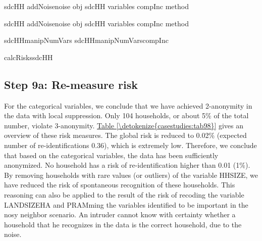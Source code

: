 \documentclass[letterpaper,10pt,english]{sphinxmanual}
\begin{document}
\begin{sphinxVerbatim}[commandchars=\\\{\},numbers=left,firstnumber=1,stepnumber=1]
sdcHH  addNoisenoise   obj  sdcHH variables  compInc method  

sdcHH  addNoisenoise   obj  sdcHH variables  compInc method  

sdcHHmanipNumVars\PYG{p}{[}\PYG{p}{]}  sdcHHmanipNumVars\PYG{p}{[}compInc\PYG{p}{]}

calcRiskssdcHH
\end{sphinxVerbatim}


\subsection{Step 9a: Re-measure risk}
\label{\detokenize{casestudies:step-9a-re-measure-risk}}
For the categorical variables, we conclude that we have achieved
2-anonymity in the data with local suppression. Only 104 households, or
about 5\% of the total number, violate 3-anonymity. \hyperref[\detokenize{casestudies:tab98}]{Table \ref{\detokenize{casestudies:tab98}}} gives an
overview of these risk measures. The global risk is reduced to 0.02\%
(expected number of re-identifications 0.36), which is extremely low.
Therefore, we conclude that based on the categorical variables, the data
has been sufficiently anonymized. No household has a risk of
re-identification higher than 0.01 (1\%). By removing households with
rare values (or outliers) of the variable HHSIZE, we have reduced the
risk of spontaneous recognition of these households. This reasoning can
also be applied to the result of the risk of recoding the variable
LANDSIZEHA and PRAMming the variables identified to be important in the
nosy neighbor scenario. An intruder cannot know with certainty whether a
household that he recognizes in the data is the correct household, due
to the noise.
\end{document}

